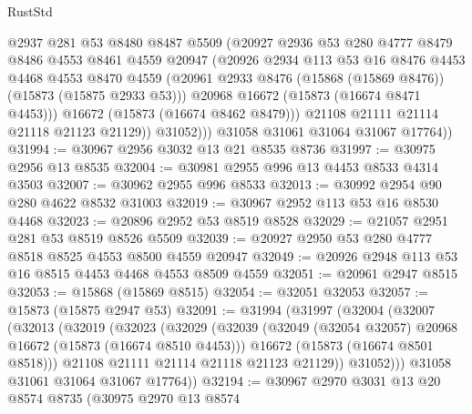 \begin{lexlean}{RustStd}
\begin{coremodule}
                  @2937
                  @281
                  @53
                  @8480
                  @8487
                  @5509
                  (@20927
                    @2936
                    @53
                    @280
                    @4777
                    @8479
                    @8486
                    @4553
                    @8461
                    @4559
                    @20947
                    (@20926
                      @2934
                      @113
                      @53
                      @16
                      @8476
                      @4453
                      @4468
                      @4553
                      @8470
                      @4559
                      (@20961 @2933 @8476 (@15868 (@15869 @8476)) (@15873 (@15875 @2933 @53)))
                      @20968
                      @16672
                      (@15873 (@16674 @8471 @4453)))
                    @16672
                    (@15873 (@16674 @8462 @8479)))
                  @21108
                  @21111
                  @21114
                  @21118
                  @21123
                  @21129))
              @31052)))
        @31058
        @31061
        @31064
        @31067
        @17764))
@31994 := @30967 @2956 @3032 @13 @21 @8535 @8736
@31997 := @30975 @2956 @13 @8535
@32004 := @30981 @2955 @996 @13 @4453 @8533 @4314 @3503
@32007 := @30962 @2955 @996 @8533
@32013 := @30992 @2954 @90 @280 @4622 @8532 @31003
@32019 := @30967 @2952 @113 @53 @16 @8530 @4468
@32023 := @20896 @2952 @53 @8519 @8528
@32029 := @21057 @2951 @281 @53 @8519 @8526 @5509
@32039 := @20927 @2950 @53 @280 @4777 @8518 @8525 @4553 @8500 @4559 @20947
@32049 := @20926 @2948 @113 @53 @16 @8515 @4453 @4468 @4553 @8509 @4559
@32051 := @20961 @2947 @8515
@32053 := @15868 (@15869 @8515)
@32054 := @32051 @32053
@32057 := @15873 (@15875 @2947 @53)
@32091 := @31994
    (@31997
      (@32004
        (@32007
          (@32013
            (@32019
              (@32023
                (@32029
                  (@32039
                    (@32049 (@32054 @32057) @20968 @16672 (@15873 (@16674 @8510 @4453)))
                    @16672
                    (@15873 (@16674 @8501 @8518)))
                  @21108
                  @21111
                  @21114
                  @21118
                  @21123
                  @21129))
              @31052)))
        @31058
        @31061
        @31064
        @31067
        @17764))
@32194 := @30967
    @2970
    @3031
    @13
    @20
    @8574
    @8735
    (@30975
      @2970
      @13
      @8574

\end{coremodule}
\end{lexlean}
